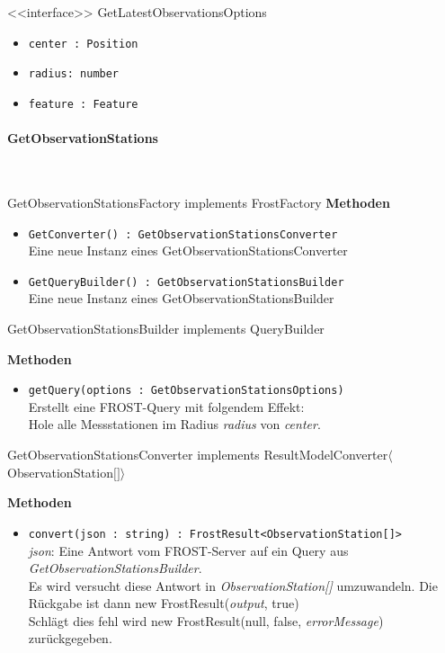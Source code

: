 \begin{Class}{<<interface>> GetLatestObservationsOptions}
    \begin{itemize}
        \item \texttt{center : Position}
        \item \texttt{radius: number}
        \item \texttt{feature : Feature}
    \end{itemize}
\end{Class}
\paragraph{GetObservationStations}\mbox{}\\

\begin{Class}{GetObservationStationsFactory implements FrostFactory}
    \textbf{Methoden}
    \begin{itemize}
        \item \texttt{GetConverter() : GetObservationStationsConverter}
        \\ Eine neue Instanz eines GetObservationStationsConverter
        \item \texttt{GetQueryBuilder() : GetObservationStationsBuilder}
        \\ Eine neue Instanz eines GetObservationStationsBuilder
    \end{itemize}
\end{Class}

\begin{Class}{GetObservationStationsBuilder implements QueryBuilder}

    \textbf{Methoden}
    \begin{itemize}
        \item \texttt{getQuery(options : GetObservationStationsOptions)}
        \\ Erstellt eine FROST-Query mit folgendem Effekt:
        \\ Hole alle Messstationen im Radius \emph{radius} von \emph{center}.
    \end{itemize}
\end{Class}

\begin{Class}{GetObservationStationsConverter implements ResultModelConverter$\langle$ObservationStation$\lbrack\rbrack\rangle$}

    \textbf{Methoden}
    \begin{itemize}
        \item \texttt{convert(json : string) : FrostResult<ObservationStation[]>}
        \\ \emph{json}: Eine Antwort vom FROST-Server auf ein Query aus \emph{GetObservationStationsBuilder}.
        \\ Es wird versucht diese Antwort in \emph{ObservationStation[]} umzuwandeln.
        Die Rückgabe ist dann new FrostResult(\emph{output}, true)
        \\ Schlägt dies fehl wird new FrostResult(null, false, \emph{errorMessage}) zurückgegeben.
    \end{itemize}
\end{Class}

